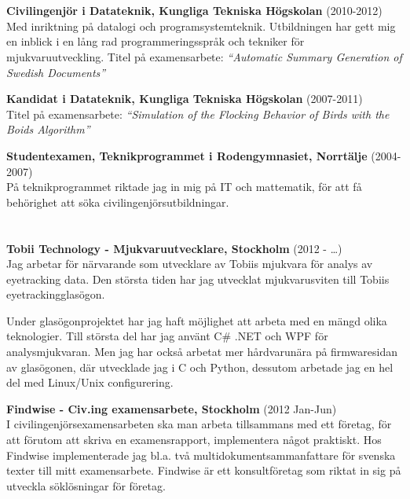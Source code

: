 \documentclass[margin,line]{resume}%
\begin{document}
\begin{resume}
	\section{}\vspace{0.001mm}

	\textbf{Civilingenjör i Datateknik, Kungliga Tekniska Högskolan}
	(2010-2012)\\
	Med inriktning på datalogi och programsystemteknik.
	Utbildningen har gett mig en inblick i en lång rad programmeringsspråk och
	tekniker för mjukvaruutveckling. Titel på examensarbete: \textit{``Automatic Summary Generation of Swedish
	Documents''}

	\textbf{Kandidat i Datateknik, Kungliga Tekniska Högskolan}
	(2007-2011)\\
	Titel på examensarbete: \textit{``Simulation of the Flocking Behavior of
	Birds with the Boids Algorithm''}

	\textbf{Studentexamen, Teknikprogrammet i Rodengymnasiet, Norrtälje} (2004-2007)\\
	På teknikprogrammet riktade jag in mig på IT och mattematik,
	för att få behörighet att söka civilingenjörsutbildningar.

\newpage
	\section{}\vspace{0.001mm}

		\textbf{Tobii Technology - Mjukvaruutvecklare, Stockholm } (2012 - \dots)\\
		Jag arbetar för närvarande som utvecklare av Tobiis mjukvara för analys av
		eyetracking data. Den största tiden har jag utvecklat mjukvarusviten
		till Tobiis eyetrackingglasögon.
		
		Under glasögonprojektet har jag haft möjlighet att arbeta med en mängd olika
		teknologier. Till största del har jag använt C\# .NET och WPF för
		analysmjukvaran. Men jag har också arbetat mer hårdvarunära på firmwaresidan
		av glasögonen, där utvecklade jag i C och Python, dessutom arbetade jag
		en hel del med Linux/Unix configurering.

		\textbf{Findwise - Civ.ing examensarbete, Stockholm } (2012 Jan-Jun)\\
		I civilingenjörsexamensarbeten ska man arbeta tillsammans med ett företag, för att
		förutom att skriva en examensrapport, implementera något praktiskt.
		Hos Findwise implementerade jag bl.a. två multidokumentsammanfattare för
		svenska texter till mitt examensarbete. Findwise är ett konsultföretag som
		riktat in sig på utveckla söklösningar för företag.


\end{resume}
\end{document}
